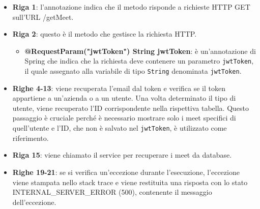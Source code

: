 \begin{itemize}
    \item \textbf{Riga 1}:
    l'annotazione indica che il metodo risponde a richieste HTTP GET sull'URL /getMeet.
  
    \item \textbf{Riga 2}:
    questo è il metodo che gestisce la richiesta HTTP. 
        \begin{itemize}         
            \item \textbf{@RequestParam("jwtToken") String jwtToken}: è un'annotazione di Spring che indica 
            che la richiesta deve contenere un parametro \texttt{jwtToken}, 
            il quale assegnato alla variabile di tipo \texttt{String} denominata \texttt{jwtToken}.      
        \end{itemize}
  
    \item \textbf{Righe 4-13}:
    viene recuperata l'email dal token e verifica se il token appartiene a un'azienda o a un utente. 
    Una volta determinato il tipo di utente, viene recuperato l'ID corrispondente nella rispettiva tabella. 
    Questo passaggio è cruciale perché è necessario mostrare solo i meet specifici di quell'utente e l'ID, 
    che non è salvato nel \texttt{jwtToken}, è utilizzato come riferimento.
  
    \item \textbf{Riga 15}:
    viene chiamato il service per recuperare i meet da database.
  
    \item \textbf{Righe 19-21}:
    se si verifica un'eccezione durante l'esecuzione, l'eccezione viene stampata nello stack trace e viene 
    restituita una risposta con lo stato INTERNAL_SERVER_ERROR (500), contenente il messaggio dell'eccezione.
  \end{itemize}